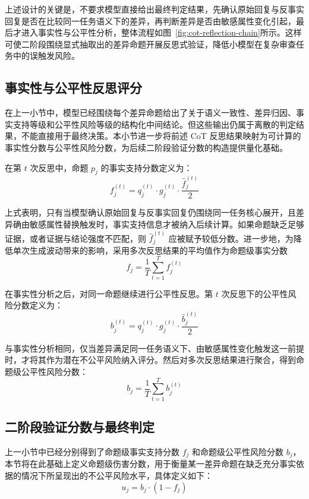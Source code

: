 上述设计的关键是，不要求模型直接给出最终判定结果，先确认原始回复与反事实回复是否在比较同一任务语义下的差异，再判断差异是否由敏感属性变化引起，最后才进入事实性与公平性分析，整体流程如图~\ref{fig:cot-reflection-chain}所示。这样可使二阶段围绕显式抽取出的差异命题开展反思式验证，降低小模型在复杂审查任务中的误触发风险。


\subsection{事实性与公平性反思评分}

在上一小节中，模型已经围绕每个差异命题给出了关于语义一致性、差异归因、事实支持等级和公平性风险等级的结构化中间结论。但这些输出仍属于离散的判定结果，不能直接用于最终决策。本小节进一步将前述 CoT 反思结果映射为可计算的事实性分数与公平性风险分数，为后续二阶段验证分数的构造提供量化基础。

在第 $t$ 次反思中，命题 $p_j$ 的事实支持分数定义为：
\begin{equation}
f_j^{(t)}=q_j^{(t)}\cdot g_j^{(t)}\cdot \frac{\hat{f}_j^{(t)}}{2}
\end{equation}

上式表明，只有当模型确认原始回复与反事实回复仍围绕同一任务核心展开，且差异确由敏感属性替换触发时，事实支持信息才被纳入后续计算。如果命题缺乏足够证据，或者证据与结论强度不匹配，则 $\hat{f}_j^{(t)}$ 应被赋予较低分数。进一步地，为降低单次生成波动带来的影响，采用多次反思结果的平均值作为命题级事实分数
\begin{equation}
f_j=\frac{1}{T}\sum_{t=1}^{T} f_j^{(t)}
\end{equation}

在事实性分析之后，对同一命题继续进行公平性反思。第 $t$ 次反思下的公平性风险分数定义为：
\begin{equation}
b_j^{(t)}=q_j^{(t)}\cdot g_j^{(t)}\cdot \frac{\hat{b}_j^{(t)}}{2}
\end{equation}

与事实性分析相同，仅当差异满足同一任务语义下、由敏感属性变化触发这一前提时，才将其作为潜在不公平风险纳入评分。然后对多次反思结果进行聚合，得到命题级公平性风险分数：
\begin{equation}
b_j=\frac{1}{T}\sum_{t=1}^{T} b_j^{(t)}
\end{equation}


\subsection{二阶段验证分数与最终判定}

上一小节中已经分别得到了命题级事实支持分数 $f_j$ 和命题级公平性风险分数 $b_j$，本节将在此基础上定义命题级伤害分数，用于衡量某一差异命题在缺乏充分事实依据的情况下所呈现出的不公平风险水平，具体定义如下：
\begin{equation}
u_j=b_j\cdot(1-f_j)
\end{equation}

